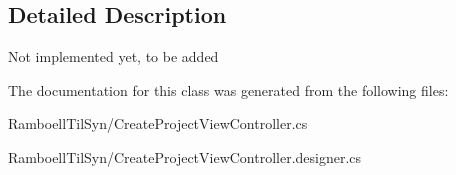 \subsection{Detailed Description}
Not implemented yet, to be added 



The documentation for this class was generated from the following files\+:\begin{DoxyCompactItemize}
\item 
Ramboell\+Til\+Syn/Create\+Project\+View\+Controller.\+cs\item 
Ramboell\+Til\+Syn/Create\+Project\+View\+Controller.\+designer.\+cs\end{DoxyCompactItemize}

